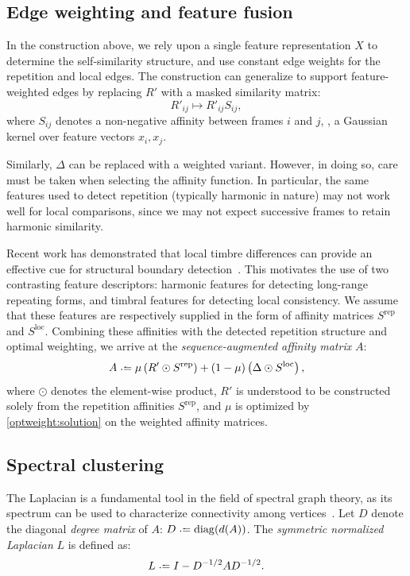 \documentclass{article}
\begin{document}
\subsection{Edge weighting and feature fusion}
In the construction above, we rely upon a single feature representation $X$ to 
determine the self-similarity structure, and use constant edge weights for the
repetition and local edges.  The construction can generalize to support
feature-weighted edges by replacing $R'$ with a masked similarity matrix:
\begin{equation}
R'_{ij} \mapsto R'_{ij} S_{ij},
\end{equation}
where $S_{ij}$ denotes a non-negative affinity between frames $i$ and $j$, \eg,
a Gaussian kernel over feature vectors $x_i, x_j$.

Similarly, $\Delta$ can be replaced with a weighted variant.  However, in doing so,
care must be taken when selecting the affinity function.  In particular, the same
features used to detect repetition (typically harmonic in nature) may not work well
for local comparisons, since we may not expect successive frames to retain
harmonic similarity.  

Recent work has demonstrated that local timbre differences 
can provide an effective cue for structural boundary
detection~\cite{kaiser2013simple}.  This motivates the use of two contrasting feature
descriptors: harmonic features for detecting long-range repeating forms, and timbral
features for detecting local consistency.  We assume that these features are
respectively supplied in the form of affinity matrices $S^\text{rep}$ and
$S^\text{loc}$.  Combining these affinities with the detected repetition structure and
optimal weighting, we arrive at the \emph{sequence-augmented affinity matrix} $A$:
\begin{equation}
A \defeq \mu \left(R' \odot S^\text{rep}\right) + (1-\mu) \left(\Delta \odot
S^\text{loc}\right),\label{saam}
\end{equation}
where $\odot$ denotes the element-wise product, $R'$ is understood to be
constructed solely from the repetition affinities $S^\text{rep}$, and $\mu$ is
optimized by \eqref{optweight:solution} on the weighted affinity matrices.


\subsection{Spectral clustering}

The Laplacian is a fundamental tool in the field of spectral graph
theory, as its spectrum can be used to characterize 
connectivity among vertices~\cite{chung1997spectral}.  
Let $D$ denote the diagonal \emph{degree matrix} of $A$: $D \defeq \diag(d(A))$.  
The \emph{symmetric normalized Laplacian} $L$ is defined as:
\begin{equation}
L \defeq I - D^{-1/2} A D^{-1/2}.\label{symlaplacian}
\end{equation}
\end{document}
